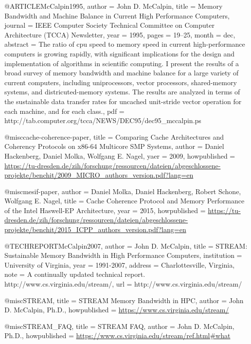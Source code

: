 @ARTICLE{McCalpin1995,
  author = {John D. McCalpin},
  title = {Memory Bandwidth and Machine Balance in Current High Performance
	Computers},
  journal = {IEEE Computer Society Technical Committee on Computer Architecture
	(TCCA) Newsletter},
  year = {1995},
  pages = {19--25},
  month = dec,
  abstract = {The ratio of cpu speed to memory speed in current high-performance
	computers is growing rapidly, with significant implications for the
	design and implementation of algorithms in scientific computing.
	I present the results of a broad survey of memory bandwidth and machine
	balance for a large variety of current computers, including uniprocessors,
	vector processors, shared-memory systems, and districuted-memory
	systems. The results are analyzed in terms of the sustainable data
	transfer rates for uncached unit-stride vector operation for each
	machine, and for each class.},
  pdf = {http://tab.computer.org/tcca/NEWS/DEC95/dec95_mccalpin.ps}
}

@misc{cache-coherence-paper,
    title = {Comparing Cache Architectures and Coherency Protocols on x86-64 Multicore SMP Systems},
    author = {Daniel Hackenberg, Daniel Molka, Wolfgang E. Nagel},
    yaer = {2009},
    howpublished = {\url{https://tu-dresden.de/zih/forschung/ressourcen/dateien/abgeschlossene-projekte/benchit/2009_MICRO_authors_version.pdf?lang=en}}
}

@misc{mesif-paper,
    author = {Daniel Molka, Daniel Hackenberg, Robert Schone, Wolfgang E. Nagel},
    title = {Cache Coherence Protocol and Memory Performance of the Intel Haswell-EP Architecture},
    year = {2015},
    howpublished = {\url{https://tu-dresden.de/zih/forschung/ressourcen/dateien/abgeschlossene-projekte/benchit/2015_ICPP_authors_version.pdf?lang=en}}
}

@TECHREPORT{McCalpin2007,
  author = {John D. McCalpin},
  title = {STREAM: Sustainable Memory Bandwidth in High Performance Computers},
  institution = {University of Virginia},
  year = {1991-2007},
  address = {Charlottesville, Virginia},
  note = {A continually updated technical report.
http://www.cs.virginia.edu/stream/},
  url = {http://www.cs.virginia.edu/stream/}
}

@misc{STREAM,
    title        = {STREAM Memory Bandwidth in HPC},
    author       = {John D. McCalpin, Ph.D.},
    howpublished = {\url{https://www.cs.virginia.edu/stream/}}
}

@misc{STREAM_FAQ,
    title        = {STREAM FAQ},
    author       = {John D. McCalpin, Ph.D.},
    howpublished = {\url{https://www.cs.virginia.edu/stream/ref.html#what}}
}

